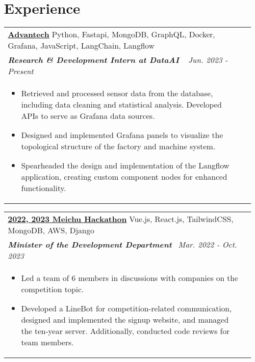 \documentclass[a4paper,8pt]{article}
\begin{document}
\section{Experience}
\begin{tabularx}{\linewidth}{ @{}l r@{} }
\color[HTML]{0000cd} \textbf{\uline{\href{https://www.advantech.com/zh-tw}{Advantech}}} \hfill \color[HTML]{371e77} Python, Fastapi, MongoDB, GraphQL, Docker, Grafana, JavaScript, LangChain, Langflow \\ 
\color[HTML]{371e77}\textbf{\textit{Research \& Development Intern at DataAI }}\ \hfill \color[HTML]{4B28A4} \textit{Jun. 2023 - Present} \\[1pt]
\begin{minipage}[t]{\linewidth}
    \begin{itemize}[nosep,after=\strut, leftmargin=2em, itemsep=2pt]
        \item Retrieved and processed sensor data from the database, including data cleaning and statistical analysis. Developed APIs to serve as Grafana data sources. 
        \item Designed and implemented Grafana panels to visualize the topological structure of the factory and machine system.
        \item Spearheaded the design and implementation of the Langflow application, creating custom component nodes for enhanced functionality.
    \end{itemize}
\end{minipage}
\end{tabularx}
\begin{tabularx}{\linewidth}{ @{}l r@{} }
\color[HTML]{0000cd} \textbf{\uline{\href{https://github.com/Official-Meichu-Hackathon}{2022, 2023 Meichu Hackathon}}} \hfill \color[HTML]{371e77}Vue.js, React.js, TailwindCSS, MongoDB, AWS, Django  \\
\color[HTML]{371e77}\textbf{\textit{Minister of the Development Department}}\ \hfill \color[HTML]{4B28A4} \textit{Mar. 2022 - Oct. 2023 } \\[2pt]
\begin{minipage}[t]{\linewidth}
    \begin{itemize}[nosep,after=\strut, leftmargin=2em, itemsep=2pt]
        \item Led a team of 6 members in discussions with companies on the competition topic.
        \item Developed a LineBot for competition-related communication, designed and implemented the signup website, and managed the ten-year server. Additionally, conducted code reviews for team members.
    \end{itemize}
\end{minipage}
\end{tabularx}
\end{document}
